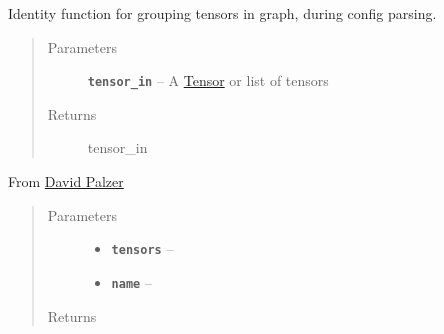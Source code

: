 \documentclass[letterpaper,10pt,english]{sphinxmanual}
\begin{document}
\begin{fulllineitems}
\label{node_ops:node_ops.ident}
Identity function for grouping tensors in graph, during config parsing.
\begin{quote}\begin{description}
\item[{Parameters}] \leavevmode
\textbf{\texttt{tensor\_in}} -- A \href{https://www.tensorflow.org/versions/r0.7/api\_docs/python/framework.html\#Tensor}{Tensor} or list of tensors

\item[{Returns}] \leavevmode
tensor\_in

\end{description}\end{quote}

\end{fulllineitems}


\begin{fulllineitems}
\label{node_ops:node_ops.khatri_rao}
From \href{https://cse.wwu.edu/computer-science/palzerd}{David Palzer}
\begin{quote}\begin{description}
\item[{Parameters}] \leavevmode\begin{itemize}
\item {} 
\textbf{\texttt{tensors}} -- 

\item {} 
\textbf{\texttt{name}} -- 

\end{itemize}

\item[{Returns}] \leavevmode


\end{description}\end{quote}

\end{fulllineitems}

\end{document}
